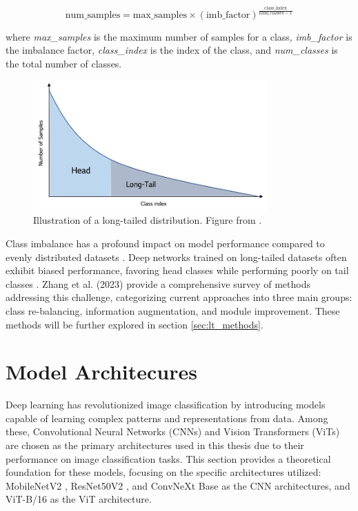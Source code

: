 \begin{equation}
    \label{eq:pareto}
\text{num\_samples} = \text{max\_samples} \times (\text{imb\_factor})^{\frac{\text{class\_index}}{\text{num\_classes} - 1}}
\end{equation}

where \textit{max\_samples} is the maximum number of samples for a class, \textit{imb\_factor} is the imbalance factor, \textit{class\_index} is the index of the class, and \textit{num\_classes} is the total number of classes.
 

\begin{figure}[ht]
    \centering
    \includegraphics[width=0.8\textwidth]{Images/long_tail_distribution.png} 
    \caption{Illustration of a long-tailed distribution. Figure from \cite{lgresearch257}.}
    \label{fig:lt_distribution} %
\end{figure}

Class imbalance has a profound impact on model performance compared to evenly distributed datasets \cite{vanhorn2017deviltailsfinegrainedclassification, cui2019classbalancedlossbasedeffective}. Deep networks trained on long-tailed datasets often exhibit biased performance, favoring head classes while performing poorly on tail classes \cite{zhang2023deep}. Zhang et al. (2023) provide a comprehensive survey of methods addressing this challenge, categorizing current approaches into three main groups: class re-balancing, information augmentation, and module improvement. These methods will be further explored in section \ref{sec:lt_methods}. 



\section{Model Architecures}
Deep learning has revolutionized image classification by introducing models capable of learning complex patterns and representations from data. Among these, Convolutional Neural Networks (CNNs) and Vision Transformers (ViTs) are chosen as the primary architectures used in this thesis due to their performance on image classification tasks. This section provides a theoretical foundation for these models, focusing on the specific architectures utilized: MobileNetV2 \cite{sandler2018mobilenetv2}, ResNet50V2 \cite{he2016}, and ConvNeXt Base \cite{todi2023convnext} as the CNN architectures, and ViT-B/16 \cite{dosovitskiy2021imageworth16x16words} as the ViT architecture.


